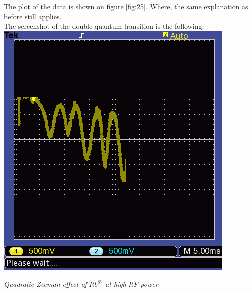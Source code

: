 \documentclass[twocolumn]{article}
\begin{document}
The plot of the data is shown on figure \ref{fig:25}. Where, the same 
explanation as before still applies.
\\
The screenshot of the double quantum transition is the following.
\center
\includegraphics[width=\linewidth]{pictures/rb87-high-raw.png}
\caption{\textit{Quadratic Zeeman effect of $Rb^{87}$ at high RF power \\ }}
\justify
\end{document}

